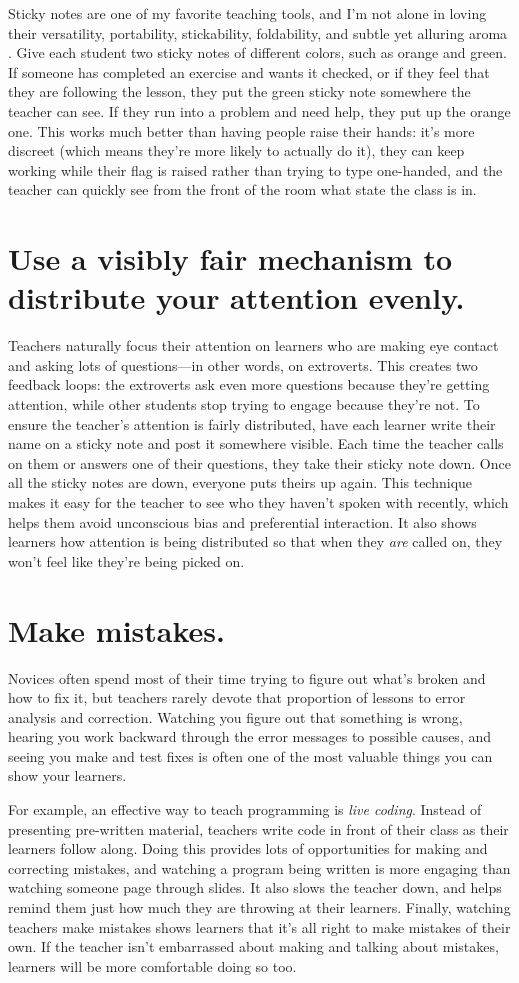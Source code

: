 \documentclass[10pt,letterpaper]{article}
\newcommand{\rulemajor}[1]{\section{#1}}
\begin{document}
Sticky notes are one of my favorite teaching tools,
and I'm not alone in loving their versatility,
portability, stickability, foldability,
and subtle yet alluring aroma \cite{Ward2015}.
Give each student two sticky notes of different colors,
such as orange and green.
If someone has completed an exercise and wants it checked,
or if they feel that they are following the lesson,
they put the green sticky note somewhere the teacher can see.
If they run into a problem and need help,
they put up the orange one.
This works much better than having people raise their hands:
it's more discreet (which means they're more likely to actually do it),
they can keep working while their flag is raised rather than trying to type one-handed,
and the teacher can quickly see from the front of the room what state the class is in.

\rulemajor{Use a visibly fair mechanism to distribute your attention evenly.}

Teachers naturally focus their attention on learners
who are making eye contact and asking lots of questions---in other words, on extroverts.
This creates two feedback loops:
the extroverts ask even more questions because they're getting attention,
while other students stop trying to engage because they're not.
To ensure the teacher's attention is fairly distributed,
have each learner write their name on a sticky note
and post it somewhere visible.
Each time the teacher calls on them or answers one of their questions,
they take their sticky note down.
Once all the sticky notes are down,
everyone puts theirs up again.
This technique makes it easy for the teacher to see who they haven't spoken with recently,
which helps them avoid unconscious bias and preferential interaction.
It also shows learners how attention is being distributed
so that when they \emph{are} called on,
they won't feel like they're being picked on.

\rulemajor{Make mistakes.}

Novices often spend most of their time trying to figure out what's broken and how to fix it,
but teachers rarely devote that proportion of lessons to error analysis and correction.
Watching you figure out that something is wrong,
hearing you work backward through the error messages to possible causes,
and seeing you make and test fixes
is often one of the most valuable things you can show your learners.

For example,
an effective way to teach programming is \emph{live coding}.
Instead of presenting pre-written material,
teachers write code in front of their class as their learners follow along.
Doing this provides lots of opportunities for making and correcting mistakes,
and watching a program being written is more engaging than watching someone page through slides.
It also slows the teacher down,
and helps remind them just how much they are throwing at their learners.
Finally,
watching teachers make mistakes shows learners that it's all right to make mistakes of their own.
If the teacher isn't embarrassed about making and talking about mistakes,
learners will be more comfortable doing so too.
\end{document}
